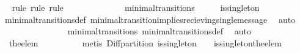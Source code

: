 \begin{isabellebody}
%
\isadelimproof
\ \ %
\endisadelimproof
%
\isatagproof
{}\isamarkupfalse%
\ {\isacharparenleft}rule{\isacharcomma}\ rule{\isacharcomma}\ rule{\isacharparenright}\isanewline
{}\isamarkupfalse%
\ {\isacharminus}\isanewline
\ \ \isamarkupfalse%
\ {\isasymsigma}\ {\isasymsigma}{\isacharprime}\isanewline
\ \ \isamarkupfalse%
\ {\isachardoublequoteopen}{\isacharparenleft}{\isasymsigma}{\isacharcomma}\ {\isasymsigma}{\isacharprime}{\isacharparenright}\ {\isasymin}\ minimal{\isacharunderscore}transitions{\isachardoublequoteclose}\isanewline
\ \ \isamarkupfalse%
\ \isamarkupfalse%
\ {\isachardoublequoteopen}is{\isacharunderscore}singleton\ {\isacharparenleft}{\isasymsigma}{\isacharprime}{\isacharminus}\ {\isasymsigma}{\isacharparenright}{\isachardoublequoteclose}\isanewline
\ \ \ \ \isamarkupfalse%
\ \ minimal{\isacharunderscore}transitions{\isacharunderscore}def\ minimal{\isacharunderscore}transition{\isacharunderscore}implies{\isacharunderscore}recieving{\isacharunderscore}single{\isacharunderscore}message\ \isamarkupfalse%
\ auto\ \isanewline
\ \ \isamarkupfalse%
\ \isamarkupfalse%
\ {\isachardoublequoteopen}{\isasymsigma}\ {\isasymsubseteq}\ {\isasymsigma}{\isacharprime}{\isachardoublequoteclose}\isanewline
\ \ \ \ \isamarkupfalse%
\ {\isacartoucheopen}{\isacharparenleft}{\isasymsigma}{\isacharcomma}\ {\isasymsigma}{\isacharprime}{\isacharparenright}\ {\isasymin}\ minimal{\isacharunderscore}transitions{\isacartoucheclose}\ minimal{\isacharunderscore}transitions{\isacharunderscore}def\ \isamarkupfalse%
\ auto\isanewline
\ \ \isamarkupfalse%
\ \isamarkupfalse%
\ {\isachardoublequoteopen}{\isasymsigma}\ {\isasymunion}\ {\isacharbraceleft}the{\isacharunderscore}elem\ {\isacharparenleft}{\isasymsigma}{\isacharprime}{\isacharminus}\ {\isasymsigma}{\isacharparenright}{\isacharbraceright}\ {\isacharequal}\ {\isasymsigma}{\isacharprime}{\isachardoublequoteclose}\isanewline
\ \ \ \ \isamarkupfalse%
\ {\isacharparenleft}metis\ Diff{\isacharunderscore}partition\ {\isacartoucheopen}is{\isacharunderscore}singleton\ {\isacharparenleft}{\isasymsigma}{\isacharprime}\ {\isacharminus}\ {\isasymsigma}{\isacharparenright}{\isacartoucheclose}\ is{\isacharunderscore}singleton{\isacharunderscore}the{\isacharunderscore}elem{\isacharparenright}\isanewline
{}\isamarkupfalse%
%
\endisatagproof
{\isafoldproof}%
%
\isadelimproof

\end{isabellebody}
